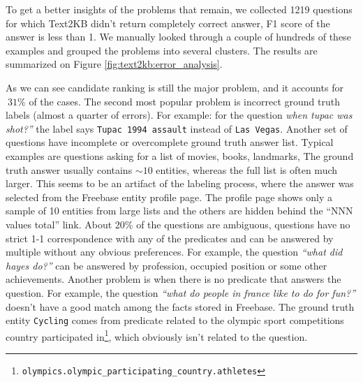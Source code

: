 To get a better insights of the problems that remain, we collected 1219 questions for which Text2KB didn't return completely correct answer, \ie F1 score of the answer is less than 1.
We manually looked through a couple of hundreds of these examples and grouped the problems into several clusters.
The results are summarized on Figure \ref{fig:text2kb:error_analysis}.

As we can see candidate ranking is still the major problem, and it accounts for $~31\%$ of the cases.
The second most popular problem is incorrect ground truth labels (almost a quarter of errors).
For example: for the question \textit{when tupac was shot?''} the label says \texttt{Tupac 1994 assault} instead of \texttt{Las Vegas}.
Another set of questions have incomplete or overcomplete ground truth answer list.
Typical examples are questions asking for a list of movies, books, landmarks, \etc
The ground truth answer usually contains $\sim10$ entities, whereas the full list is often much larger.
This seems to be an artifact of the labeling process, where the answer was selected from the Freebase entity profile page.
The profile page shows only a sample of 10 entities from large lists and the others are hidden behind the ``NNN values total'' link.
About 20\% of the questions are ambiguous, \ie questions have no strict 1-1 correspondence with any of the predicates and can be answered by multiple without any obvious preferences.
For example, the question \textit{``what did hayes do?''} can be answered by profession, occupied position or some other achievements.
Another problem is when there is no predicate that answers the question.
For example, the question \textit{``what do people in france like to do for fun?''} doesn't have a good match among the facts stored in Freebase.
The ground truth entity \texttt{Cycling} comes from predicate related to the olympic sport competitions country participated in\footnote{\texttt{olympics.olympic\_participating\_country.athletes}}, which obviously isn't related to the question.

